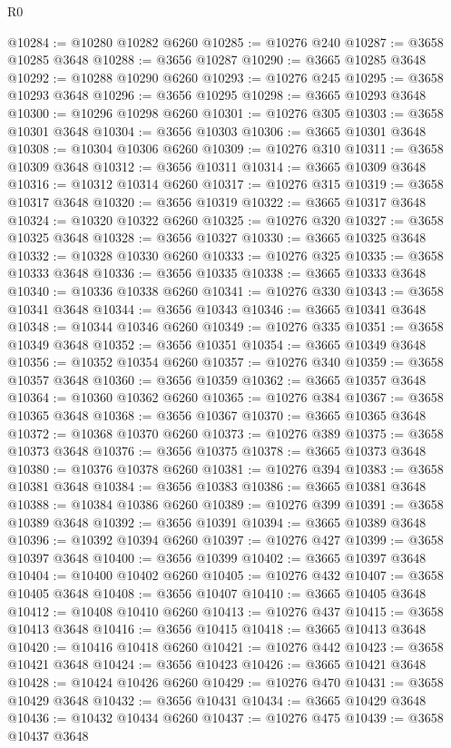 \begin{lexlean}{R0}
\begin{coremodule}
@10284 := @10280 @10282 @6260
@10285 := @10276 @240
@10287 := @3658 @10285 @3648
@10288 := @3656 @10287
@10290 := @3665 @10285 @3648
@10292 := @10288 @10290 @6260
@10293 := @10276 @245
@10295 := @3658 @10293 @3648
@10296 := @3656 @10295
@10298 := @3665 @10293 @3648
@10300 := @10296 @10298 @6260
@10301 := @10276 @305
@10303 := @3658 @10301 @3648
@10304 := @3656 @10303
@10306 := @3665 @10301 @3648
@10308 := @10304 @10306 @6260
@10309 := @10276 @310
@10311 := @3658 @10309 @3648
@10312 := @3656 @10311
@10314 := @3665 @10309 @3648
@10316 := @10312 @10314 @6260
@10317 := @10276 @315
@10319 := @3658 @10317 @3648
@10320 := @3656 @10319
@10322 := @3665 @10317 @3648
@10324 := @10320 @10322 @6260
@10325 := @10276 @320
@10327 := @3658 @10325 @3648
@10328 := @3656 @10327
@10330 := @3665 @10325 @3648
@10332 := @10328 @10330 @6260
@10333 := @10276 @325
@10335 := @3658 @10333 @3648
@10336 := @3656 @10335
@10338 := @3665 @10333 @3648
@10340 := @10336 @10338 @6260
@10341 := @10276 @330
@10343 := @3658 @10341 @3648
@10344 := @3656 @10343
@10346 := @3665 @10341 @3648
@10348 := @10344 @10346 @6260
@10349 := @10276 @335
@10351 := @3658 @10349 @3648
@10352 := @3656 @10351
@10354 := @3665 @10349 @3648
@10356 := @10352 @10354 @6260
@10357 := @10276 @340
@10359 := @3658 @10357 @3648
@10360 := @3656 @10359
@10362 := @3665 @10357 @3648
@10364 := @10360 @10362 @6260
@10365 := @10276 @384
@10367 := @3658 @10365 @3648
@10368 := @3656 @10367
@10370 := @3665 @10365 @3648
@10372 := @10368 @10370 @6260
@10373 := @10276 @389
@10375 := @3658 @10373 @3648
@10376 := @3656 @10375
@10378 := @3665 @10373 @3648
@10380 := @10376 @10378 @6260
@10381 := @10276 @394
@10383 := @3658 @10381 @3648
@10384 := @3656 @10383
@10386 := @3665 @10381 @3648
@10388 := @10384 @10386 @6260
@10389 := @10276 @399
@10391 := @3658 @10389 @3648
@10392 := @3656 @10391
@10394 := @3665 @10389 @3648
@10396 := @10392 @10394 @6260
@10397 := @10276 @427
@10399 := @3658 @10397 @3648
@10400 := @3656 @10399
@10402 := @3665 @10397 @3648
@10404 := @10400 @10402 @6260
@10405 := @10276 @432
@10407 := @3658 @10405 @3648
@10408 := @3656 @10407
@10410 := @3665 @10405 @3648
@10412 := @10408 @10410 @6260
@10413 := @10276 @437
@10415 := @3658 @10413 @3648
@10416 := @3656 @10415
@10418 := @3665 @10413 @3648
@10420 := @10416 @10418 @6260
@10421 := @10276 @442
@10423 := @3658 @10421 @3648
@10424 := @3656 @10423
@10426 := @3665 @10421 @3648
@10428 := @10424 @10426 @6260
@10429 := @10276 @470
@10431 := @3658 @10429 @3648
@10432 := @3656 @10431
@10434 := @3665 @10429 @3648
@10436 := @10432 @10434 @6260
@10437 := @10276 @475
@10439 := @3658 @10437 @3648

\end{coremodule}
\end{lexlean}
